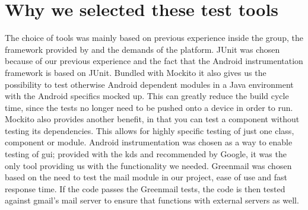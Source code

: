 \section{Why we selected these test tools}
The choice of tools was mainly based on previous experience inside the group, the framework provided by and the demands of the platform. 
\newline
\newline
JUnit was chosen because of our previous experience and the fact that the Android instrumentation framework is based on JUnit. Bundled with Mockito it also gives us the possibility to test otherwise Android dependent modules in a Java environment with the Android specifics mocked up. This can greatly reduce the build cycle time, since the tests no longer need to be pushed onto a device in order to run. Mockito also provides another benefit, in that you can test a component without testing its dependencies. This allows for highly specific testing of just one class, component or module.
\newline
\newline
Android instrumentation was chosen as a way to enable testing of \gls{gui}; provided with the \gls{kds} and recommended by Google, it was the only tool providing us with the functionality we needed.
\newline
\newline
Greenmail was chosen based on the need to test the mail module in our project, ease of use and fast response time. If the code passes the Greenmail tests, the code is then tested against gmail’s mail server to ensure that functions with external servers as well. 

